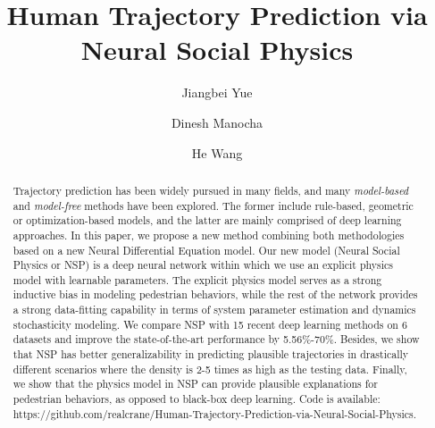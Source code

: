 \documentclass[runningheads]{llncs}
\begin{document}
\pagestyle{headings}
\mainmatter
\def\ECCVSubNumber{609}  

\title{Human Trajectory Prediction via Neural Social Physics} 

\begin{comment}
\titlerunning{ECCV-22 submission ID \ECCVSubNumber} 
\authorrunning{ECCV-22 submission ID \ECCVSubNumber} 
\author{Anonymous ECCV submission}
\institute{Paper ID \ECCVSubNumber}
\end{comment}


\author{Jiangbei Yue \and
Dinesh Manocha \and
He Wang}



\maketitle

\begin{abstract}
Trajectory prediction has been widely pursued in many fields, and many \textit{model-based} and \textit{model-free} methods have been explored. The former include rule-based, geometric or optimization-based models, and the latter are mainly comprised of deep learning approaches. In this paper, we propose a new method combining both methodologies based on a new Neural Differential Equation model. Our new model (Neural Social Physics or NSP) is a deep neural network within which we use an explicit physics model with learnable parameters. The explicit physics model serves as a strong inductive bias in modeling pedestrian behaviors, while the rest of the network provides a strong data-fitting capability in terms of system parameter estimation and dynamics stochasticity modeling. We compare NSP with 15 recent deep learning methods on 6 datasets and improve the state-of-the-art performance by 5.56\%-70\%. Besides, we show that NSP has better generalizability in predicting plausible trajectories in drastically different scenarios where the density is 2-5 times as high as the testing data. Finally, we show that the physics model in NSP can provide plausible explanations for pedestrian behaviors, as opposed to black-box deep learning. Code is available: https://github.com/realcrane/Human-Trajectory-Prediction-via-Neural-Social-Physics.
\end{abstract}
\end{document}
